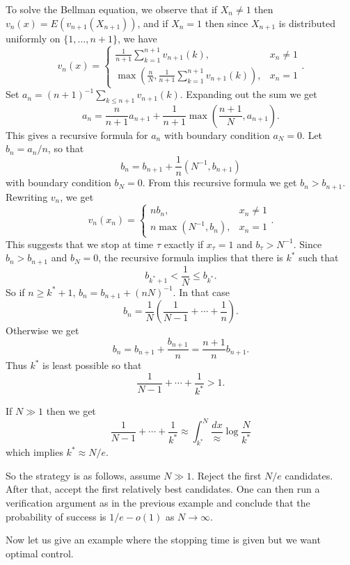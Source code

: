 \documentclass[12pt]{book}
\theoremstyle{definition}
\newenvironment{example}
  {\pushQED{\qed}\renewcommand{\qedsymbol}{$\diamondsuit$}\examplex}
  {\popQED\endexamplex}
\begin{document}
\begin{example}
To solve the Bellman equation, we observe that if $X_n \neq 1$ then $v_n(x) = E(v_{n+1}(X_{n+1}))$, and if $X_n = 1$ then since $X_{n+1}$ is distributed uniformly on $\{1, \dots, n+1\}$, we have
$$v_n(x) = \begin{cases}
\frac{1}{n+1} \sum_{k=1}^{n+1} v_{n+1}(k), &x_n \neq 1\\
\max\left(\frac{n}{N}, \frac{1}{n+1} \sum_{k=1}^{n+1} v_{n+1}(k)\right), &x_n = 1
\end{cases}.$$
Set $a_n = (n+1)^{-1} \sum_{k \leq n+1} v_{n+1}(k)$.
Expanding out the sum we get
$$a_n = \frac{n}{n+1} a_{n+1} + \frac{1}{n+1} \max\left(\frac{n + 1}{N}, a_{n+1}\right).$$
This gives a recursive formula for $a_n$ with boundary condition $a_N = 0$.
Let $b_n = a_n/n$, so that
$$b_n = b_{n+1} + \frac{1}{n}(N^{-1}, b_{n+1})$$
with boundary condition $b_N = 0$. From this recursive formula we get $b_n > b_{n+1}$.
Rewriting $v_n$, we get
$$v_n(x_n) = \begin{cases}
nb_n, &x_n \neq 1\\
n\max(N^{-1}, b_n), &x_n = 1
\end{cases}.$$
This suggests that we stop at time $\tau$ exactly if $x_\tau = 1$ and $b_\tau > N^{-1}$.
Since $b_n > b_{n+1}$ and $b_N = 0$, the recursive formula implies that there is $k^*$ such that
$$b_{k^* + 1} < \frac{1}{N} \leq b_{k^*}.$$
So if $n \geq k^* + 1$, $b_n = b_{n+1} + (nN)^{-1}$.
In that case
$$b_n = \frac{1}{N}\left(\frac{1}{N-1} + \cdots + \frac{1}{n}\right).$$
Otherwise we get
$$b_n = b_{n+1} + \frac{b_{n+1}}{n} = \frac{n+1}{n} b_{n+1}.$$
Thus $k^*$ is least possible so that
$$\frac{1}{N - 1} + \cdots + \frac{1}{k^*} > 1.$$

If $N \gg 1$ then we get
$$\frac{1}{N - 1} + \cdots + \frac{1}{k^*} \approx \int_{k^*}^N \frac{dx} \approx \log\frac{N}{k^*}$$
which implies $k^* \approx N/e$.

So the strategy is as follows, assume $N \gg 1$.
Reject the first $N/e$ candidates.
After that, accept the first relatively best candidates.
One can then run a verification argument as in the previous example and conclude that the probability of success is $1/e - o(1)$ as $N \to \infty$.
\end{example}

Now let us give an example where the stopping time is given but we want optimal control.
\end{document}
